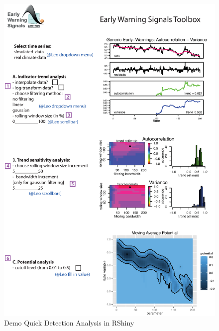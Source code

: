 \documentclass[12pt,a4paper,final]{article}
\begin{document}
\begin{figure}[h]
\begin{center}
\includegraphics[scale=0.8]{scheme_RShiny_v3.eps}
\caption{Demo Quick Detection Analysis in RShiny}
\end{center}
\label{fig:demoQDA}
\end{figure}
\end{document}

